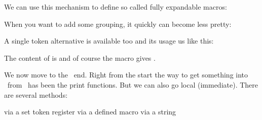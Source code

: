 \getbuffer[edef]\getbuffer[ldef]

\luatokentable\TestB

\luatokentable\TestD

We can use this mechanism to define so called fully expandable macros:

\startbuffer[def]
\stopbuffer

\startbuffer[use]
\scratchdimen{}

\the\scratchdimen
\stopbuffer

\typebuffer[def][option=TEX]
\typebuffer[use][option=TEX]

\getbuffer[def]\getbuffer[use]

When you want to add some grouping, it quickly can become less pretty:

\startbuffer[def]
\def\WidthOf#1%
  {\dimexpr
      \beginlocalcontrol
        \begingroup
          \setbox0\hbox{#1}%
          \expandafter
        \endgroup
      \expandafter
      \endlocalcontrol
      \the\wd0
   \relax}
\stopbuffer

\startbuffer[use]
\scratchdimen{}

\the\scratchdimen
\stopbuffer

\typebuffer[def][option=TEX]
\typebuffer[use][option=TEX]

\getbuffer[def]\getbuffer[use]

A single token alternative is available too and its usage us like this:

\startbuffer
 \def\TestA{\scratchcounter=100 }
\edef\TestB{\localcontrol\TestA \the\scratchcounter}
\edef\TestC{\localcontrolled{\TestA} \the\scratchcounter}
\stopbuffer

\typebuffer[option=TEX] \getbuffer

The content of \type {\TestB} is \quote {\tttf\meaningless\TestB} and of course
the \type {\TestC} macro gives \quote {\tttf\meaningless\TestC}.

We now move to the \LUA\ end. Right from the start the way to get something into
\TEX\ from \LUA\ has been the print functions. But we can also go local
(immediate). There are several methods:

\startitemize[packed]
\startitem via a set token register \stopitem
\startitem via a defined macro \stopitem
\startitem via a string \stopitem
\stopitemize

